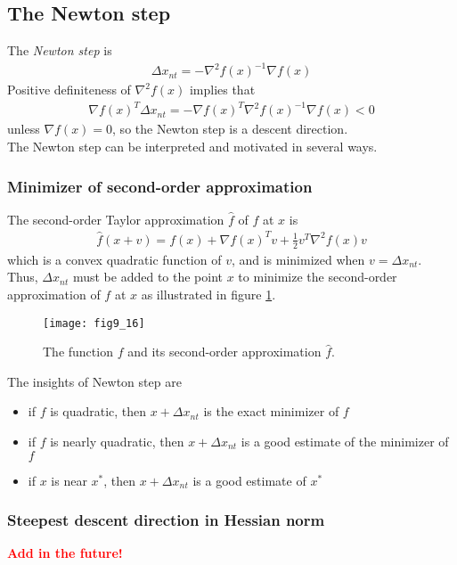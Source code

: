 \subsection{The Newton step}
The \textit{Newton step} is
\begin{align*}
  \Delta x_{nt}=-\nabla^2f(x)^{-1}\nabla f(x)
\end{align*}
Positive definiteness of $\nabla^2f(x)$ implies that
\begin{align*}
  \nabla f(x)^T\Delta x_{nt}=-\nabla f(x)^T\nabla^2f(x)^{-1}\nabla f(x)<0
\end{align*}
unless $\nabla f(x)=0$, so the Newton step is a descent direction.\\
The Newton step can be interpreted and motivated in several ways.

\subsubsection{Minimizer of second-order approximation}
The second-order Taylor approximation $\hat{f}$ of $f$ at $x$ is
\begin{align}
  \hat{f}(x+v)=f(x)+\nabla f(x)^Tv+\frac{1}{2}v^T\nabla^2 f(x)v\label{eq:9.28}
\end{align}
which is a convex quadratic function of $v$, and is minimized when $v=\Delta x_{nt}$.
Thus, $\Delta x_{nt}$ must be added to the point $x$ to minimize the second-order approximation of $f$ at $x$ as illustrated in figure \ref{fig:9.16}.
\begin{figure}
  \centering
  \texttt{[image: fig9\_16]}
  \caption{The function $f$ and its second-order approximation $\hat{f}$.}
  \label{fig:9.16}
\end{figure}
The insights of Newton step are
\begin{itemize}
  \item if $f$ is quadratic, then $x+\Delta x_{nt}$ is the exact minimizer of $f$
  \item if $f$ is nearly quadratic, then $x+\Delta x_{nt}$ is a good estimate of the minimizer of $f$
  \item if $x$ is near $x^\ast$, then $x+\Delta x_{nt}$ is a good estimate of $x^\ast$
\end{itemize}

\subsubsection{Steepest descent direction in Hessian norm}
\textcolor{red}{\textbf{Add in the future!}}

